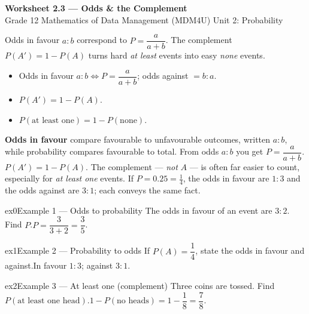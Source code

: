 \documentclass[11pt]{article}
\begin{document}
\begin{center}
{\LARGE\bfseries\color{titleblue}Worksheet 2.3 --- Odds \& the Complement}\\[2pt]
{\small Grade 12 Mathematics of Data Management (MDM4U) \textperiodcentered{} Unit 2: Probability}
\end{center}

\begin{ideabox}
Odds in favour $a:b$ correspond to $P=\dfrac{a}{a+b}$. The complement $P(A')=1-P(A)$ turns hard \emph{at least} events into easy \emph{none} events.
\begin{itemize}[leftmargin=*,itemsep=2pt]
  \item Odds in favour $a:b\Leftrightarrow P=\dfrac{a}{a+b}$; odds against $=b:a$.
  \item $P(A')=1-P(A)$.
  \item $P(\text{at least one})=1-P(\text{none})$.
\end{itemize}
\end{ideabox}

\begin{learnbox}
\textbf{Odds in favour} compare favourable to unfavourable outcomes, written $a:b$, while probability compares favourable to total. From odds $a:b$ you get $P=\dfrac{a}{a+b}$.
$P(A')=1-P(A)$. The complement — \emph{not} $A$ — is often far easier to count, especially for \emph{at least one} events.
If $P=0.25=\tfrac14$, the odds in favour are $1:3$ and the odds against are $3:1$; each conveys the same fact.
\end{learnbox}


\begin{example}{ex0}{Example 1 --- Odds to probability}
The odds in favour of an event are $3:2$. Find $P$.\soln $P=\dfrac{3}{3+2}=\dfrac35$.
\end{example}

\begin{example}{ex1}{Example 2 --- Probability to odds}
If $P(A)=\dfrac14$, state the odds in favour and against.\soln In favour $1:3$; against $3:1$.
\end{example}

\begin{example}{ex2}{Example 3 --- At least one (complement)}
Three coins are tossed. Find $P(\text{at least one head})$.\soln $1-P(\text{no heads})=1-\dfrac18=\dfrac78$.
\end{example}
\end{document}
